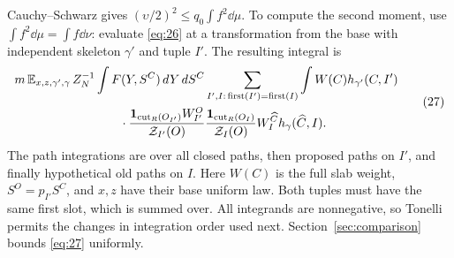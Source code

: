 Cauchy--Schwarz gives
\((\upsilon/2)^2\le q_0\int f^2\dd\mu\). To compute the second
moment, use \(\int f^2\dd\mu=\int f\dd\nu\): evaluate
\eqref{eq:26} at a transformation from the base with independent
skeleton \(\gamma'\) and tuple \(I'\). The resulting integral is
\[
 \begin{split}
 &m\,\mathbb E_{x,z,\gamma',\gamma}\, Z_N^{-1}\int
 F(Y,S^C)\,dY\,dS^C
 \sum_{I',I:\,\mathrm{first}(I')=\mathrm{first}(I)}\int
   W(C) h_{\gamma'}(C,I')\\
 &\hspace{30mm}\cdot
     \frac{\mathbf 1_{\mathrm{cut}_R(O_{I'})}W_{I'}^O}
          {\mathcal Z_{I'}(O)}
     \frac{\mathbf 1_{\mathrm{cut}_R(O_I)}}{\mathcal Z_I(O)}
          W_I^{\widehat C} h_\gamma(\widehat C,I).
 \end{split}                                                          \tag{27}\label{eq:27}
\]
The path integrations are over all closed paths, then proposed paths
on \(I'\), and finally hypothetical old paths on \(I\). Here \(W(C)\)
is the full slab weight, \(S^O=p_{I'}S^C\), and $x,z$ have their base
uniform law. Both tuples must have the same first slot, which is summed
over. All integrands are nonnegative, so Tonelli permits the changes in
integration order used next. Section~\ref{sec:comparison} bounds
\eqref{eq:27} uniformly.
